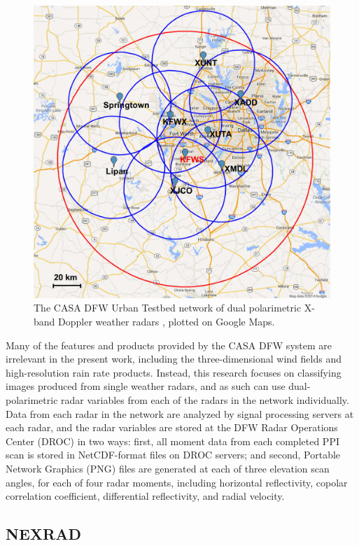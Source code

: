 \begin{figure}[h]
	\centering
	\includegraphics[width=\textwidth]{./thesis_code/plots/casa_dfw_map.jpg}
	\caption{The CASA DFW Urban Testbed network of dual polarimetric X-band Doppler weather radars \cite{chen2015quantitative}, plotted on Google Maps.}
	\label{fig:background_casamap}
\end{figure}

Many of the features and products provided by the CASA DFW system are irrelevant in the present work, including the three-dimensional wind fields and high-resolution rain rate products.
Instead, this research focuses on classifying images produced from single weather radars, and as such can use dual-polarimetric radar variables from each of the radars in the network individually.
Data from each radar in the network are analyzed by signal processing servers at each radar, and the radar variables are stored at the DFW Radar Operations Center (DROC) in two ways: first, all moment data from each completed PPI scan is stored in NetCDF-format files on DROC servers; and second, Portable Network Graphics (PNG) files are generated at each of three elevation scan angles, for each of four radar moments, including horizontal reflectivity, copolar correlation coefficient, differential reflectivity, and radial velocity.

\subsection{NEXRAD}
\label{ssec:background_nexrad}

